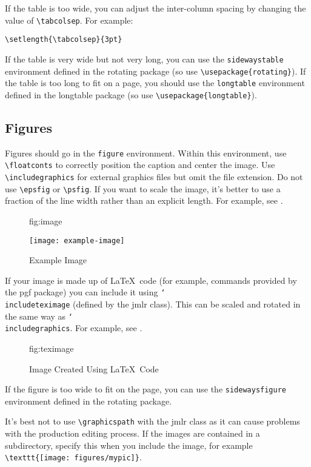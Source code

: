 \documentclass[pmlr]{jmlr}%
\newcommand{\cs}[1]{\texttt{\char`\\#1}}
\begin{document}
If the table is too wide, you can adjust the inter-column
spacing by changing the value of \verb|\tabcolsep|. For
example:
\begin{verbatim}
\setlength{\tabcolsep}{3pt}
\end{verbatim}
If the table is very wide but not very long, you can use the
\texttt{sidewaystable} environment defined in the
\textsf{rotating} package (so use \verb|\usepackage{rotating}|).
If the table is too long to fit on a page, you should use the
\texttt{longtable} environment defined in the \textsf{longtable}
package (so use \verb|\usepackage{longtable}|).

\subsection{Figures}
\label{sec:figures}

Figures should go in the \texttt{figure} environment. Within this
environment, use \verb|\floatconts| to correctly position the
caption and center the image. Use \verb|\includegraphics|
for external graphics files but omit the file extension. Do not
use \verb|\epsfig| or \verb|\psfig|. If you want to scale the
image, it's better to use a fraction of the line width rather
than an explicit length. For example, see .

\begin{figure}[htbp]
\floatconts
  {fig:image}
  {\caption{Example Image}}
  {\texttt{[image: example-image]}}
\end{figure}

If your image is made up of \LaTeX\ code (for example, commands
provided by the \textsf{pgf} package) you can include it using
\cs{includeteximage} (defined by the \textsf{jmlr} class). This
can be scaled and rotated in the same way as \cs{includegraphics}.
For example, see .

\begin{figure}[htbp]
\floatconts
  {fig:teximage}
  {\caption{Image Created Using \LaTeX\ Code}}
  {}
\end{figure}

If the figure is too wide to fit on the page, you can use the
\texttt{sidewaysfigure} environment defined in the
\textsf{rotating} package.

It's best not to use \verb|\graphicspath| with the \textsf{jmlr} class
as it can cause problems with the production editing process. If the
images are contained in a subdirectory, specify this when you
include the image, for example \verb|\texttt{[image: figures/mypic]}|.
\end{document}
